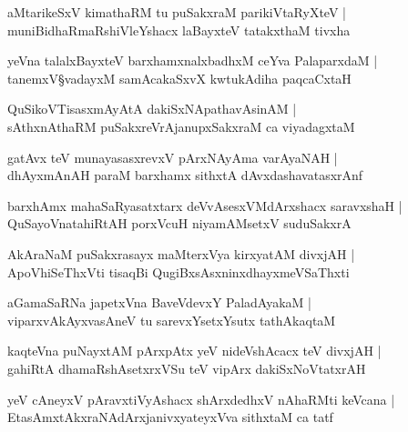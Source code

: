 \begin{shloka}
aMtarikeSxV kimathaRM tu puSakxraM parikiVtaRyXteV |\\
muniBidhaRmaRshiVleYshacx laBayxteV tatakxthaM tivxha
\end{shloka}

\begin{shloka}
yeVna talalxBayxteV barxhamxnalxbadhxM ceYva PalaparxdaM |\\
tanemxV\S vadayxM samAcakaSxvX kwtukAdiha paqcaCxtaH 
\end{shloka}

\begin{shloka}
QuSikoVTisasxmAyAtA dakiSxNApathavAsinAM |\\
sAthxnAthaRM puSakxreVrAjanupxSakxraM ca viyadagxtaM
\end{shloka}

\begin{shloka}
gatAvx teV munayasasxrevxV pArxNAyAma varAyaNAH |\\
dhAyxmAnAH paraM barxhamx sithxtA dAvxdashavatasxrAnf
\end{shloka}

\begin{shloka}
barxhAmx mahaSaRyasatxtarx deVvAsesxVMdArxshacx saravxshaH |\\
QuSayoVnatahiRtAH porxVcuH niyamAMsetxV suduSakxrA\R
\end{shloka}

\begin{shloka}
AkAraNaM puSakxrasayx maMterxVya kirxyatAM divxjAH |\\
ApoVhiSeThxVti tisaqBi QugiBxsAsxninxdhayxmeVSaThxti
\end{shloka}

\begin{shloka}
aGamaSaRNa japetxVna BaveVdevxY PaladAyakaM |\\
viparxvAkAyxvasAneV tu sarevxYsetxYsutx tathAkaqtaM 
\end{shloka}

\begin{shloka}
kaqteVna puNayxtAM pArxpAtx yeV nideVshAcacx teV divxjAH |\\
gahiRtA dhamaRshAsetxrxVSu teV vipArx dakiSxNoVtatxrAH 
\end{shloka}

\begin{shloka}
yeV cAneyxV pAravxtiVyAshacx shArxdedhxV nAhaRMti keVcana |\\
EtasAmxtAkxraNAdArxjanivxyateyxVva sithxtaM ca tatf
\end{shloka}

